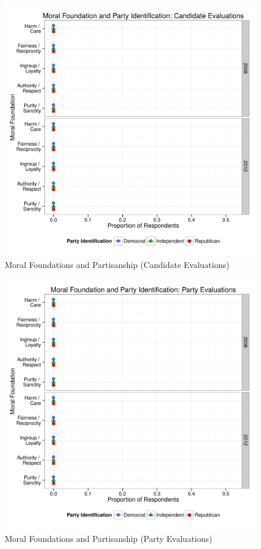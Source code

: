 \documentclass[12pt]{article}
\begin{document}
\begin{figure}[ht]\centering
\includegraphics[scale=.4]{../calc/fig/a2_mft_pid_ca.pdf}
\caption{Moral Foundations and Partisanship (Candidate Evaluations)}\label{fig:a2_mft_pid_ca}
\end{figure}

\begin{figure}[ht]\centering
\includegraphics[scale=.4]{../calc/fig/a3_mft_pid_pa.pdf}
\caption{Moral Foundations and Partisanship (Party Evaluations)}\label{fig:a3_mft_pid_pa}
\end{figure}
\end{document}
